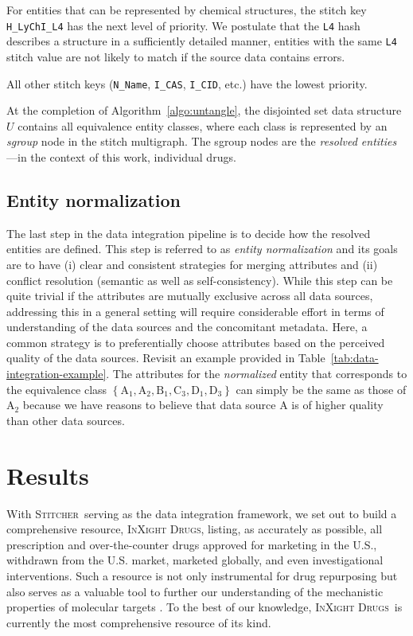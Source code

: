 \documentclass{bmcart}
\newcommand\st{\textsc{Stitcher}}
\newcommand\ix{\textsc{InXight Drugs}}
\begin{document}
For entities that can be represented by chemical structures, the stitch 
key \texttt{H\_LyChI\_L4} has the next level of priority. We postulate that the \texttt{L4} 
hash describes a structure in a sufficiently detailed manner, entities with the same \texttt{L4} 
stitch value are not likely to match if the source data contains errors.  

All other stitch keys (\texttt{N\_Name}, \texttt{I\_CAS}, \texttt{I\_CID}, etc.) have the
lowest priority.

At the completion of Algorithm~\ref{algo:untangle}, the disjointed set
data structure $U$ contains all equivalence entity classes, where each class 
is represented by an \emph{sgroup} node in the stitch multigraph. 
The sgroup nodes are the \emph{resolved entities}---in the context of this work, individual drugs.

\subsection*{Entity normalization}
The last step in the data integration pipeline is to decide how the
resolved entities are defined. This step is referred to as \emph{entity
normalization} and its goals are to have (i) clear and consistent
strategies for merging attributes and (ii) conflict resolution
(semantic as well as self-consistency). While this step can be quite
trivial if the attributes are mutually exclusive across all data
sources, addressing this in a general setting will require considerable
effort in terms of understanding of the data sources and the concomitant metadata.
Here, a common strategy is to preferentially choose attributes based
on the perceived quality of the data sources. Revisit an example provided in 
Table~\ref{tab:data-integration-example}.
The attributes for the \emph{normalized} entity that corresponds to
the equivalence class $\left\{\textrm{A}_1, \textrm{A}_2, \textrm{B}_1,
\textrm{C}_3, \textrm{D}_1, \textrm{D}_3\right\}$ can simply be the
same as those of $\textrm{A}_2$ because we have reasons to believe
that data source A is of higher quality than other data sources.

\section*{Results}
With \st\ serving as the data integration framework, we set out to
build a comprehensive resource, \ix, listing, as accurately as possible, 
all prescription and over-the-counter drugs approved for marketing in the U.S.,
withdrawn from the U.S. market, marketed globally, and even investigational interventions.
Such a resource is not only instrumental for drug repurposing but also serves 
as a valuable tool to further our understanding of the mechanistic properties of molecular targets
\cite{Huang2011,Huang2019}. To the best of our knowledge, \ix\ is
currently the most comprehensive resource of its kind.
\end{document}
